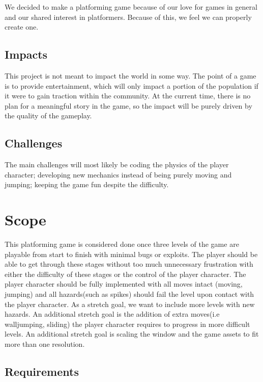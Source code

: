 \documentclass[10pt,conference,onecolumn,compsoc]{IEEEtran}
\begin{document}
We decided to make a platforming game because of our love for games in general and our shared interest in platformers. Because of this, we feel we can properly create one.



\subsection{Impacts}
This project is not meant to impact the world in some way. The point of a game is to provide entertainment, which will only impact a portion of the population if it were to gain traction within the community. At the current time, there is no plan for a meaningful story in the game, so the impact will be purely driven by the quality of the gameplay.

\subsection{Challenges}
The main challenges will most likely be coding the physics of the player character; developing new mechanics instead of being purely moving and jumping; keeping the game fun despite the difficulty.


\section{Scope}
This platforming game is considered done once three levels of the game are playable from start to finish with minimal bugs or exploits. The player should be able to get through these stages without too much unnecessary frustration with either the difficulty of these stages or the control of the player character. The player character should be fully implemented with all moves intact (moving, jumping) and all hazards(such as spikes) should fail the level upon contact with the player character. As a stretch goal, we want to include more levels with new hazards. An additional stretch goal is the addition of extra moves(i.e walljumping, sliding) the player character requires to progress in more difficult levels. An additional stretch goal is scaling the window and the game assets to fit more than one resolution.

\subsection{Requirements}
\end{document}
